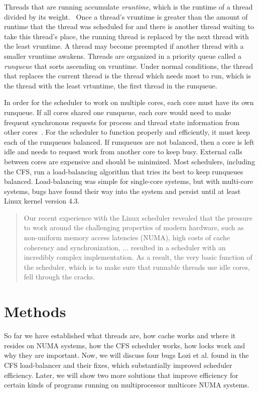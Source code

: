 \documentclass{sig-alternate}
\begin{document}
Threads that are running accumulate \emph{vruntime}, which is the runtime of a thread divided by its weight.~\cite{SchedThesis} Once a thread's vruntime is greater than the amount of runtime that the thread was scheduled for and there is another thread waiting to take this thread's place, the running thread is replaced by the next thread with the least vruntime. A thread may become preempted if another thread with a smaller vruntime awakens. Threads are organized in a priority queue called a \emph{runqueue} that sorts ascending on vruntime. Under normal conditions, the thread that replaces the current thread is the thread which needs most to run, which is the thread with the least vrtuntime, the first thread in the runqueue.~\cite{Lozi:2016}

In order for the scheduler to work on multiple cores, each core must have its own runqueue. If all cores shared one runqueue, each core would need to make frequent synchronous requests for process and thread state information from other cores~\cite{Lozi:2016}. For the scheduler to function properly and efficiently, it must keep each of the runqueues balanced. If runqueues are not balanced, then a core is left idle and needs to request work from another core to keep busy. External calls between cores are expensive and should be minimized. Most schedulers, including the CFS, run a load-balancing algorithm that tries its best to keep runqueues balanced. Load-balancing was simple for single-core systems, but with multi-core systems, bugs have found their way into the system and persist until at least Linux kernel version 4.3.

\begin{quote}
Our recent experience with the Linux scheduler revealed that the pressure to work around the challenging properties of modern hardware, such as non-uniform memory access latencies (NUMA), high costs of cache coherency and synchronization, ... resulted in a scheduler with an incredibly complex implementation. As a result, the very basic function of the scheduler, which is to make sure that runnable threads use idle cores, fell through the cracks.~\cite{Lozi:2016}
\end{quote}

\section{Methods}
\label{sec:methods}

So far we have established what threads are, how cache works and where it resides on NUMA systems, how the CFS scheduler works, how locks work and why they are important. Now, we will discuss four bugs Lozi et al. found in the CFS load-balancer and their fixes, which substantially improved scheduler efficiency. Later, we will show two more solutions that improve efficiency for certain kinds of programs running on multiprocessor multicore NUMA systems.
\end{document}
